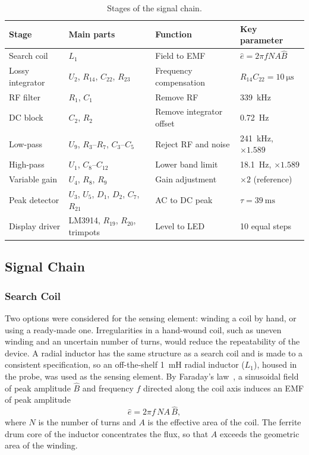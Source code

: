 \documentclass[11pt,a4paper]{article}
\begin{document}
\begin{table}[htbp]
  \centering
  \caption{Stages of the signal chain.}
  \label{tab:arch-stages}
  \small
  \begin{tabular}{@{}llll@{}}
    \toprule
    Stage & Main parts & Function & Key parameter \\
    \midrule
    Search coil      & $L_1$ & Field to EMF & $\hat e = 2\pi f N A \hat B$ \\
    Lossy integrator & $U_2$, $R_{14}$, $C_{22}$, $R_{23}$ & Frequency compensation & $R_{14}C_{22} = \SI{10}{\micro\second}$ \\
    RF filter        & $R_1$, $C_1$ & Remove RF & \SI{339}{\kilo\hertz} \\
    DC block         & $C_2$, $R_2$ & Remove integrator offset & \SI{0.72}{\hertz} \\
    Low-pass         & $U_9$, $R_3$--$R_7$, $C_3$--$C_5$ & Reject RF and noise & \SI{241}{\kilo\hertz}, $\times1.589$ \\
    High-pass        & $U_1$, $C_8$--$C_{12}$ & Lower band limit & \SI{18.1}{\hertz}, $\times1.589$ \\
    Variable gain    & $U_4$, $R_8$, $R_9$ & Gain adjustment & $\times2$ (reference) \\
    Peak detector    & $U_3$, $U_5$, $D_1$, $D_2$, $C_7$, $R_{21}$ & AC to DC peak & $\tau = \SI{39}{\milli\second}$ \\
    Display driver   & LM3914, $R_{19}$, $R_{20}$, trimpots & Level to LED & 10 equal steps \\
    \bottomrule
  \end{tabular}
\end{table}

\subsection{Signal Chain}
\label{sec:arch-stages}

\subsubsection{Search Coil}
Two options were considered for the sensing element: winding a coil by hand, or using a ready-made one. Irregularities in a hand-wound coil, such as uneven winding and an uncertain number of turns, would reduce the repeatability of the device. A radial inductor has the same structure as a search coil and is made to a consistent specification, so an off-the-shelf \SI{1}{\milli\henry} radial inductor ($L_1$), housed in the probe, was used as the sensing element. By Faraday's law~\cite{tumanski2007}, a sinusoidal field of peak amplitude $\hat B$ and frequency $f$ directed along the coil axis induces an EMF of peak amplitude
\begin{equation}
  \hat e = 2\pi f\,N A\,\hat B,
  \label{eq:emf}
\end{equation}
where $N$ is the number of turns and $A$ is the effective area of the coil. The ferrite drum core of the inductor concentrates the flux, so that $A$ exceeds the geometric area of the winding.
\end{document}
